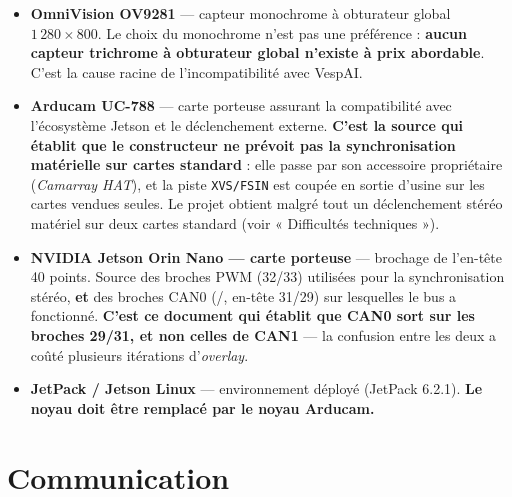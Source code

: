 \documentclass[11pt,a4paper]{article}
\begin{document}
\begin{itemize}[leftmargin=*]
  \item \textbf{OmniVision OV9281} \cite{omnivision_ov9281} — capteur monochrome à
        obturateur global $1\,280 \times 800$. Le choix du monochrome n'est pas une
        préférence : \textbf{aucun capteur trichrome à obturateur global n'existe à prix
        abordable}. C'est la cause racine de l'incompatibilité avec VespAI.

  \item \textbf{Arducam UC-788} \cite{arducam_uc788} — carte porteuse assurant la
        compatibilité avec l'écosystème Jetson et le déclenchement externe. \textbf{C'est la
        source qui établit que le constructeur ne prévoit pas la synchronisation matérielle
        sur cartes standard} : elle passe par son accessoire propriétaire (\emph{Camarray
        HAT}), et la piste \texttt{XVS/FSIN} est coupée en sortie d'usine sur les cartes
        vendues seules. Le projet obtient malgré tout un déclenchement stéréo matériel sur
        deux cartes standard (voir « Difficultés techniques »).

  \item \textbf{NVIDIA Jetson Orin Nano — carte porteuse} \cite{nvidia_orin_nano_carrier} —
        brochage de l'en-tête 40 points. Source des broches PWM (32/33) utilisées pour la
        synchronisation stéréo, \textbf{et} des broches CAN0 (/,
        en-tête 31/29) sur lesquelles le bus a fonctionné. \textbf{C'est ce document qui
        établit que CAN0 sort sur les broches 29/31, et non celles de CAN1} — la confusion
        entre les deux a coûté plusieurs itérations d'\emph{overlay}.

  \item \textbf{JetPack / Jetson Linux} \cite{nvidia_jetpack} — environnement déployé
        (JetPack 6.2.1). \textbf{Le noyau doit être remplacé par le noyau Arducam.}
\end{itemize}

\section{Communication}
\end{document}
